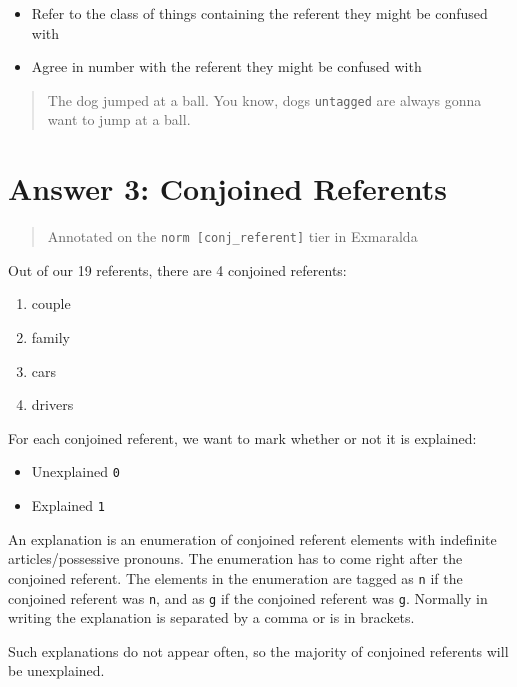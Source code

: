 \documentclass[
]{book}
\providecommand{\tightlist}{%
  \setlength{\itemsep}{0pt}\setlength{\parskip}{0pt}}
\begin{document}
\begin{itemize}
\item
  Refer to the class of things containing the referent they might be confused with
\item
  Agree in number with the referent they might be confused with
\end{itemize}

\begin{quote}
The dog jumped at a ball.
You know, dogs \texttt{untagged} are always gonna want to jump at a ball.
\end{quote}

\hypertarget{answer-3-conjoined-referents}{%
\chapter{Answer 3: Conjoined Referents}\label{answer-3-conjoined-referents}}

\begin{quote}
Annotated on the \texttt{norm\ {[}conj\_referent{]}} tier in Exmaralda
\end{quote}

Out of our 19 referents, there are 4 conjoined referents:

\begin{enumerate}
\def\labelenumi{\arabic{enumi}.}
\tightlist
\item
  couple
\item
  family
\item
  cars
\item
  drivers
\end{enumerate}

For each conjoined referent, we want to mark whether or not it is explained:

\begin{itemize}
\tightlist
\item
  Unexplained \texttt{0}
\item
  Explained \texttt{1}
\end{itemize}

An explanation is an enumeration of conjoined referent elements with indefinite articles/possessive pronouns.
The enumeration has to come right after the conjoined referent.
The elements in the enumeration are tagged as \texttt{n} if the conjoined referent was \texttt{n}, and as \texttt{g} if the conjoined referent was \texttt{g}.
Normally in writing the explanation is separated by a comma or is in brackets.

Such explanations do not appear often, so the majority of conjoined referents will be unexplained.
\end{document}
